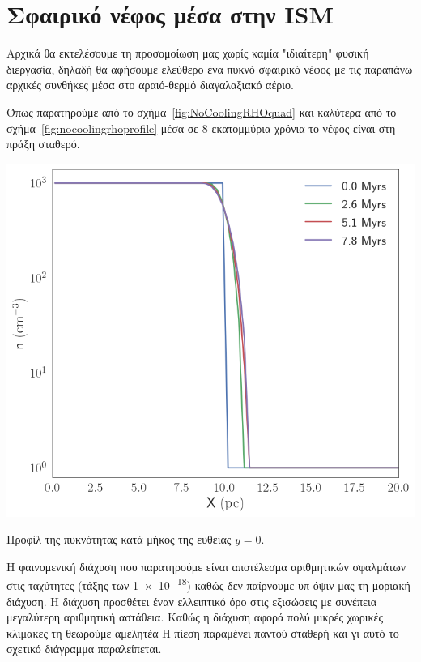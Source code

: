 	
	\section{Σφαιρικό νέφος μέσα στην ISM}

	Αρχικά θα εκτελέσουμε τη προσομοίωση μας χωρίς καμία "ιδιαίτερη" φυσική διεργασία, δηλαδή θα αφήσουμε ελεύθερο ένα πυκνό σφαιρικό νέφος με τις παραπάνω αρχικές συνθήκες μέσα στο αραιό-θερμό διαγαλαξιακό αέριο.
	
 Όπως παρατηρούμε από το σχήμα~\ref{fig:NoCoolingRHOquad} και καλύτερα από το σχήμα~\ref{fig:nocoolingrhoprofile} μέσα σε 8 εκατομμύρια χρόνια το νέφος είναι στη πράξη σταθερό. 
 
 \begin{marginfigure}
 	\centering
 	\includegraphics[width=1.0\linewidth]{DataImages/NoCoolingRHOprofile}
 	\caption{Προφίλ της πυκνότητας κατά μήκος της ευθείας $y=0$.}
 	\label{fig:nocoolingrhoprofile}
 \end{marginfigure}	
 
  Η φαινομενική διάχυση που παρατηρούμε είναι αποτέλεσμα αριθμητικών σφαλμάτων στις ταχύτητες (τάξης των \num{1e-18}) καθώς δεν παίρνουμε υπ όψιν μας τη μοριακή διάχυση. Η διάχυση προσθέτει έναν ελλειπτικό όρο στις εξισώσεις με συνέπεια μεγαλύτερη αριθμητική αστάθεια. Καθώς η διάχυση αφορά πολύ μικρές χωρικές κλίμακες τη θεωρούμε αμελητέα  
  Η πίεση παραμένει παντού σταθερή και γι αυτό το σχετικό διάγραμμα παραλείπεται.  
 	
